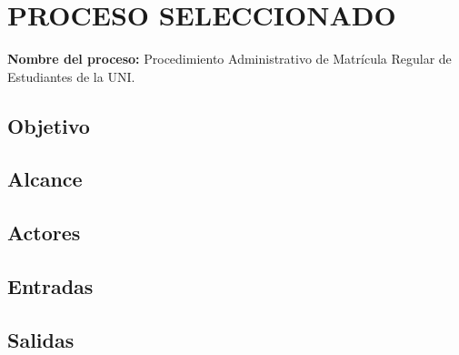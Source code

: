 \section{PROCESO SELECCIONADO}

\textbf{Nombre del proceso:} Procedimiento Administrativo de Matrícula Regular de Estudiantes de la UNI.

\subsection{Objetivo}





\subsection{Alcance}





\subsection{Actores}





\subsection{Entradas}





\subsection{Salidas}





